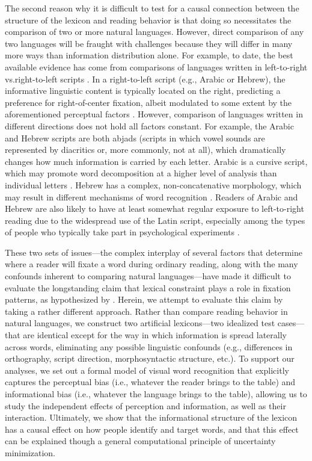 \documentclass[doc,biblatex]{apa7}
\begin{document}
The second reason why it is difficult to test for a causal connection between the structure of the lexicon and reading behavior is that doing so necessitates the comparison of two or more natural languages. However, direct comparison of any two languages will be fraught with challenges because they will differ in many more ways than information distribution alone. For example, to date, the best available evidence has come from comparisons of languages written in left-to-right vs.\@ right-to-left scripts \parencite{Pollatsek:1981, Farid:1996, Deutsch:1999}. In a right-to-left script (e.g., Arabic or Hebrew), the informative linguistic content is typically located on the right, predicting a preference for right-of-center fixation, albeit modulated to some extent by the aforementioned perceptual factors \parencite{Nazir:2004, Brysbaert:2005}. However, comparison of languages written in different directions does not hold all factors constant. For example, the Arabic and Hebrew scripts are both abjads (scripts in which vowel sounds are represented by diacritics or, more commonly, not at all), which dramatically changes how much information is carried by each letter. Arabic is a cursive script, which may promote word decomposition at a higher level of analysis than individual letters \parencite{Farid:1996}. Hebrew has a complex, non-concatenative morphology, which may result in different mechanisms of word recognition \parencite{Velan:2011}. Readers of Arabic and Hebrew are also likely to have at least somewhat regular exposure to left-to-right reading due to the widespread use of the Latin script, especially among the types of people who typically take part in psychological experiments \parencite{Ducrot:2002, Sieroff:2015}.

These two sets of issues---the complex interplay of several factors that determine where a reader will fixate a word during ordinary reading, along with the many confounds inherent to comparing natural languages---have made it difficult to evaluate the longstanding claim that lexical constraint plays a role in fixation patterns, as hypothesized by \textcite[p.~298]{ORegan:1981}. Herein, we attempt to evaluate this claim by taking a rather different approach. Rather than compare reading behavior in natural languages, we construct two artificial lexicons---two idealized test cases---that are identical except for the way in which information is spread laterally across words, eliminating any possible linguistic confounds (e.g., differences in orthography, script direction, morphosyntactic structure, etc.). To support our analyses, we set out a formal model of visual word recognition that explicitly captures the perceptual bias (i.e., whatever the reader brings to the table) and informational bias (i.e., whatever the language brings to the table), allowing us to study the independent effects of perception and information, as well as their interaction. Ultimately, we show that the informational structure of the lexicon has a causal effect on how people identify and target words, and that this effect can be explained though a general computational principle of uncertainty minimization.
\end{document}
